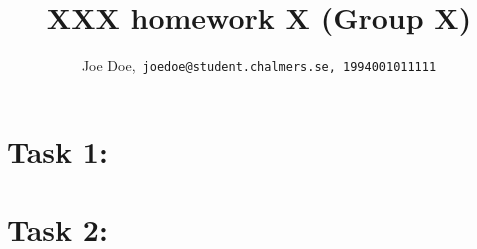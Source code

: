 \documentclass{article}
\title{XXX homework X (Group X)}
\author{Joe Doe,\   \texttt{joedoe@student.chalmers.se, 1994001011111}}
\begin{document}
\maketitle

\section{Task 1:}



\section{Task 2:}



\end{document}
